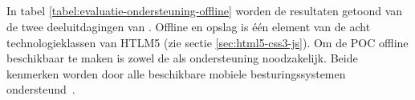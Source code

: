 % 
% 
% 
% 


\subsection{}
\label{sec:evaluatie-ondersteuning-offline}

In tabel \ref{tabel:evaluatie-ondersteuning-offline} worden de resultaten getoond van de twee deeluitdagingen van .
Offline en opslag is één element van de acht technologieklassen van HTLM5 (zie sectie \ref{sec:html5-css3-js}).
Om de POC offline beschikbaar te maken is zowel de  als  ondersteuning noodzakelijk.
Beide kenmerken worden door alle beschikbare mobiele besturingssystemen ondersteund~\cite{Deveria2013c}. 



